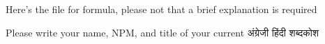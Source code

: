 Here's the file for formula, please not that a brief explanation is required

Please write your name, NPM, and title of your current अंग्रेजी हिंदी शब्दकोश